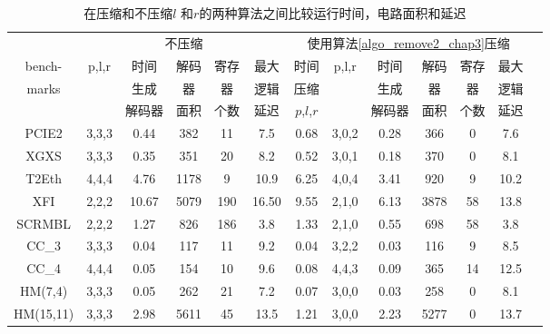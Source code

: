 \begin{table}[t]%
\caption{在压缩和不压缩$l$ 和$r$的两种算法之间比较运行时间，电路面积和延迟}
\label{tab:compare_min}
\centering
\begin{tabular}{|c|c|c|c|c|c|c|c|c|c|c|c|c|}
\hline
            & \multicolumn{5}{|c|}{不压缩} &  \multicolumn{6}{|c|}{使用算法\ref{algo_remove2_chap3}压缩} \\\cline{2-12}
bench-      & p,l,r& 时间       & 解码    & 寄存& 最大                                      &时间        & p,l,r& 时间       &解码     & 寄存&最大\\
marks       &      & 生成       & 器      & 器  &  逻辑                                     &压缩        &      & 生成       & 器      & 器  &逻辑            \\
            &      & 解码器     &  面积   & 个数&延迟                                       &$p$,$l$,$r$ &      & 解码器     &  面积   & 个数& 延迟\\\hline\hline
PCIE2       & 3,3,3& 0.44       &  382    & 11  & 7.5                                       &0.68        & 3,0,2& 0.28       &  366    & 0   & 7.6             \\\hline
XGXS        & 3,3,3& 0.35       &  351    &20   &8.2                                        &0.52        & 3,0,1& 0.18       &  370    & 0   & 8.1             \\\hline
T2Eth       & 4,4,4& 4.76       &  1178   & 9   & 10.9                                      &6.25        & 4,0,4& 3.41       &  920    & 9   & 10.2            \\\hline
XFI         & 2,2,2& 10.67      & 5079    &190  & 16.50                                     &9.55        & 2,1,0& 6.13       &  3878   & 58  & 13.8            \\\hline
SCRMBL      & 2,2,2& 1.27       & 826     &186  &  3.8                                      &1.33        & 2,1,0& 0.55       &  698    & 58  & 3.8             \\\hline
CC\_3       & 3,3,3& 0.04       &  117    & 11  & 9.2                                       &0.04        & 3,2,2& 0.03       &  116    & 9   & 8.5             \\\hline
CC\_4       & 4,4,4& 0.05       & 154     & 10  & 9.6                                       &0.08        & 4,4,3& 0.09       &  365    & 14  & 12.5            \\\hline
HM(7,4)     & 3,3,3& 0.05       & 262     & 21  & 7.2                                       &0.07        & 3,0,0& 0.03       &  258    & 0   & 8.1             \\\hline
HM(15,11)   & 3,3,3& 2.98       & 5611    & 45  & 13.5                                      &1.21        & 3,0,0& 2.23       &  5277   & 0   & 13.7            \\\hline
\end{tabular}
\end{table}%

